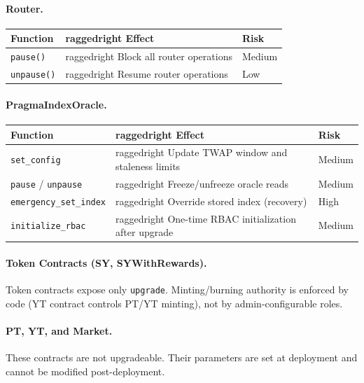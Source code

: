 \paragraph{Router.}
\begin{center}
\begin{tabularx}{\textwidth}{l >{raggedright\arraybackslash}X l}
\toprule
\textbf{Function} & \textbf{Effect} & \textbf{Risk} \\
\midrule
\texttt{pause()} & Block all router operations & Medium \\
\texttt{unpause()} & Resume router operations & Low \\
\bottomrule
\end{tabularx}
\end{center}

\paragraph{PragmaIndexOracle.}
\begin{center}
\begin{tabularx}{\textwidth}{l >{raggedright\arraybackslash}X l}
\toprule
\textbf{Function} & \textbf{Effect} & \textbf{Risk} \\
\midrule
\texttt{set\_config} & Update TWAP window and staleness limits & Medium \\
\texttt{pause} / \texttt{unpause} & Freeze/unfreeze oracle reads & Medium \\
\texttt{emergency\_set\_index} & Override stored index (recovery) & High \\
\texttt{initialize\_rbac} & One-time RBAC initialization after upgrade & Medium \\
\bottomrule
\end{tabularx}
\end{center}

\paragraph{Token Contracts (SY, SYWithRewards).}
Token contracts expose only \texttt{upgrade}. Minting/burning authority is enforced by code (YT contract controls PT/YT minting), not by admin-configurable roles.

\paragraph{PT, YT, and Market.}
These contracts are not upgradeable. Their parameters are set at deployment and cannot be modified post-deployment.


